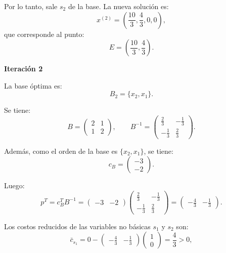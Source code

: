 \begin{enumerate}
Por lo tanto, sale $s_2$ de la base. La nueva solución es:
\begin{equation}
x^{(2)}
=
\left(
\frac{10}{3},
\frac{4}{3},
0,
0
\right),
\end{equation}
que corresponde al punto:
\begin{equation}
E=\left(\frac{10}{3},\frac{4}{3}\right).
\end{equation}

\textbf{Iteración 2}

La base óptima es:
\begin{equation}
B_2=\{x_2,x_1\}.
\end{equation}

Se tiene:
\begin{equation}
B=
\begin{pmatrix}
2 & 1\\
1 & 2
\end{pmatrix},
\qquad
B^{-1}
=
\begin{pmatrix}
\frac{2}{3} & -\frac{1}{3}\\
-\frac{1}{3} & \frac{2}{3}
\end{pmatrix}.
\end{equation}

Además, como el orden de la base es $\{x_2,x_1\}$, se tiene:
\begin{equation}
c_B=
\begin{pmatrix}
-3\\
-2
\end{pmatrix}.
\end{equation}

Luego:
\begin{equation}
p^T=c_B^T B^{-1}
=
\begin{pmatrix}
-3 & -2
\end{pmatrix}
\begin{pmatrix}
\frac{2}{3} & -\frac{1}{3}\\
-\frac{1}{3} & \frac{2}{3}
\end{pmatrix}
=
\begin{pmatrix}
-\frac{4}{3} & -\frac{1}{3}
\end{pmatrix}.
\end{equation}

Los costos reducidos de las variables no básicas $s_1$ y $s_2$ son:
\begin{equation}
\bar{c}_{s_1}
=
0-
\begin{pmatrix}
-\frac{4}{3} & -\frac{1}{3}
\end{pmatrix}
\begin{pmatrix}
1\\
0
\end{pmatrix}
=
\frac{4}{3}>0,
\end{equation}


\end{enumerate}
